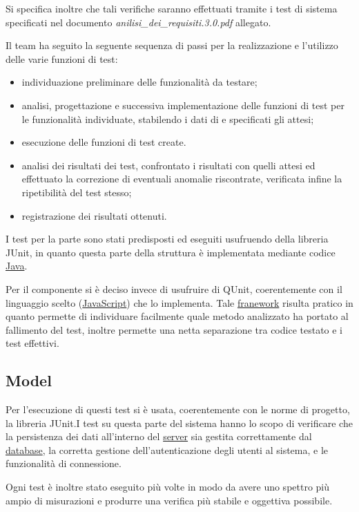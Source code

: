 Si specifica inoltre che tali verifiche saranno effettuati tramite i test di sistema specificati nel documento \textit{anilisi\_dei\_requisiti.3.0.pdf} allegato.
\clearpage

Il team ha seguito la seguente sequenza di passi per la realizzazione e l'utilizzo delle varie funzioni di test:
\begin{itemize}[noitemsep,nolistsep]
\item individuazione preliminare delle funzionalità da testare;
\item analisi, progettazione e successiva implementazione delle funzioni di test per le funzionalità individuate, stabilendo i dati di  e specificati gli  attesi;
\item esecuzione delle funzioni di test create.
\item analisi dei risultati dei test, confrontato i risultati con quelli attesi ed effettuato la correzione di eventuali anomalie riscontrate, verificata infine la ripetibilità del test stesso;
\item registrazione dei risultati ottenuti.
\end{itemize}

I test per la parte  sono stati predisposti ed eseguiti usufruendo della libreria JUnit, in quanto questa parte della struttura è implementata mediante codice \underline{Java}.

Per il componente  si è deciso invece di usufruire di QUnit, coerentemente con il linguaggio scelto (\underline{JavaScript}) che lo implementa. Tale \underline{franework} risulta pratico in quanto permette di individuare facilmente quale metodo analizzato ha portato al fallimento del test, inoltre permette una netta separazione tra codice testato e i test effettivi.

\subsection{Model}
Per l'esecuzione di questi test si è usata, coerentemente con le norme di progetto, la libreria JUnit.I test su questa parte del sistema hanno lo scopo di verificare che la persistenza dei dati all'interno del \underline{server} sia gestita correttamente dal \underline{database}, la corretta gestione dell'autenticazione degli utenti al sistema, e le funzionalità di connessione.

Ogni test è inoltre stato eseguito più volte in modo da avere uno spettro più ampio di misurazioni e produrre una verifica più stabile e oggettiva possibile.

